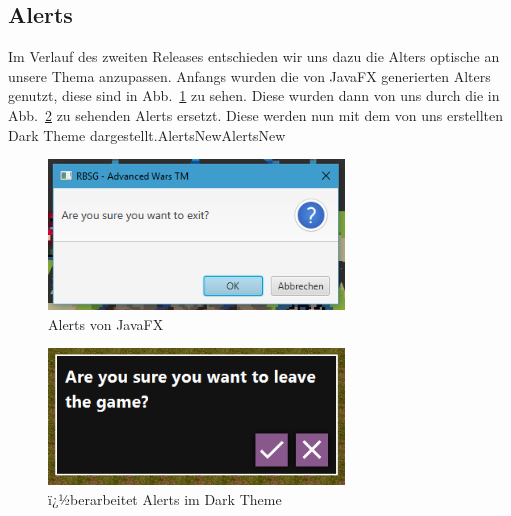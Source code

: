 \documentclass[12pt, titlepage]{scrartcl}
\newcommand{\Abb}[1]{%
	Abb.\ \ref{#1}%
}
\begin{document}
			\subsection{Alerts}
			Im Verlauf des zweiten Releases entschieden wir uns dazu die Alters optische an unsere Thema anzupassen. Anfangs wurden die von JavaFX generierten Alters genutzt, diese sind in \Abb{AlertsOld} zu sehen. Diese wurden dann von uns durch die in \Abb{AlertsNew} zu sehenden Alerts ersetzt. Diese werden nun mit dem von uns erstellten Dark Theme dargestellt.AlertsNewAlertsNew
			\begin{figure}[H] 
				\centering
				\includegraphics[width=0.7\textwidth]{Alert_Old.PNG}
				\caption{Alerts von JavaFX}
				\label{AlertsOld}
			\end{figure}
		
			\begin{figure}[H] 
				\centering
				\includegraphics[width=0.7\textwidth]{Alerts_New_Style.PNG}
				\caption{ï¿½berarbeitet Alerts im Dark Theme}
				\label{AlertsNew}
			\end{figure} 
		
	\newpage
	\appendix
	\listoffigures
	\listoftables
\end{document}
